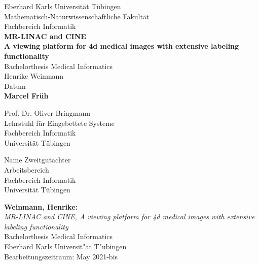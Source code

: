 \documentclass[12pt,a4paper]{report}
\begin{document}

\begin{titlepage}
 \begin{center}
  {\LARGE Eberhard Karls Universität Tübingen}\\
  {\large Mathematisch-Naturwissenschaftliche Fakultät\\
  Fachbereich Informatik\\[2cm]}
  {\Huge\bf  MR-LINAC and CINE\\[1.5cm]}
{\Large\bf A viewing platform for 4d medical images with extensive labeling functionality\\[0.8cm]}
  {\Large Bachelorthesis Medical Informatics\\[3.5cm]}
  {\Large Henrike Weinmann}\\[0.5cm]
  Datum\\[4cm]
{\small\bf Marcel Früh}\\[0.5cm]
  \parbox{7cm}{\begin{center}{
  	\large Prof. Dr. Oliver Bringmann}\\
	  Lehrstuhl für Eingebettete Systeme\\
	  Fachbereich Informatik\\
	  Universität Tübingen
	  \end{center}}\hfill\parbox{7cm}{\begin{center}
  {\large Name Zweitgutachter}\\
	  Arbeitsbereich\\
	  Fachbereich Informatik\\
	  Universität Tübingen \end{center}
 }
  \end{center}
\end{titlepage}


\thispagestyle{empty}
\vspace*{\fill}
\begin{minipage}{11.2cm}
\textbf{Weinmann, Henrike:}\\
\emph{MR-LINAC and CINE, A viewing platform for 4d medical images with extensive labeling functionality}\\ Bachelorthesis Medical Informatics\\
Eberhard Karls Universit"at T"ubingen\\
Bearbeitungszeitraum: May 2021-bis
\end{minipage}
\newpage
\end{document}
